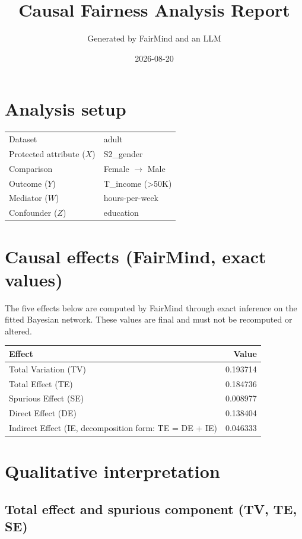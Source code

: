 \documentclass[11pt]{article}
\title{Causal Fairness Analysis Report}
\author{Generated by FairMind and an LLM}
\date{2026-08-20}
\begin{document}
\maketitle

\section{Analysis setup}

\begin{tabular}{ll}
\toprule
Dataset & adult \\
Protected attribute ($X$) & S2\_gender \\
Comparison & Female $\to$ Male \\
Outcome ($Y$) & T\_income (>50K) \\
Mediator ($W$) & hours-per-week \\
Confounder ($Z$) & education \\
\bottomrule
\end{tabular}

\section{Causal effects (FairMind, exact values)}

The five effects below are computed by FairMind through exact inference on the
fitted Bayesian network. These values are final and must not be recomputed or
altered.

\begin{tabular}{lr}
\toprule
Effect & Value \\
\midrule
Total Variation (TV) & 0.193714 \\
Total Effect (TE) & 0.184736 \\
Spurious Effect (SE) & 0.008977 \\
Direct Effect (DE) & 0.138404 \\
Indirect Effect (IE, decomposition form: TE = DE + IE) & 0.046333 \\
\bottomrule
\end{tabular}

\section{Qualitative interpretation}

\subsection{Total effect and spurious component (TV, TE, SE)}
\end{document}
